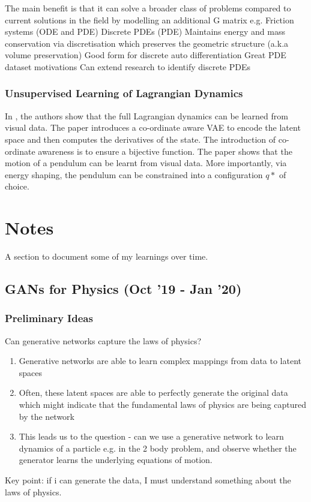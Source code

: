 \documentclass{article}
\begin{document}
The main benefit is that it can solve a broader class of problems compared to current solutions in the field by modelling an additional G matrix e.g.
Friction systems (ODE and PDE)
Discrete PDEs (PDE)
Maintains energy and mass conservation via discretisation which preserves the geometric structure (a.k.a volume preservation)
Good form for discrete auto differentiation
Great PDE dataset motivations
Can extend research to identify discrete PDEs

\subsubsection*{Unsupervised Learning of Lagrangian Dynamics}

In \cite{zhong_unsupervised_2020}, the authors show that the full Lagrangian dynamics can be learned from visual data. The paper introduces a co-ordinate aware VAE to encode the latent space and then computes the derivatives of the state. The introduction of co-ordinate awareness is to ensure a bijective function. The paper shows that the motion of a pendulum can be learnt from visual data. More importantly, via energy shaping, the pendulum can be constrained into a configuration $q*$ of choice.




\section{Notes}

A section to document some of my learnings over time.

\subsection{GANs for Physics (Oct '19 - Jan '20)}

\subsubsection*{Preliminary Ideas}

Can generative networks capture the laws of physics?

\begin{enumerate}
\item Generative networks are able to learn complex mappings from data to latent spaces
\item Often, these latent spaces are able to perfectly generate the original data which might indicate that the fundamental laws of physics are being captured by the network
\item This leads us to the question - can we use a generative network to learn dynamics of a particle e.g. in the 2 body problem, and observe whether the generator learns the underlying equations of motion.
\end{enumerate}
Key point: if i can generate the data, I must understand something about the laws of physics.
\end{document}
